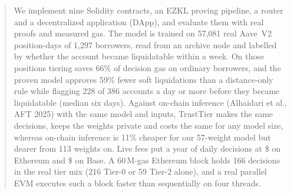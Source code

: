\documentclass[sigconf,nonacm]{acmart}
\begin{document}
\begin{abstract}
We implement nine Solidity contracts, an EZKL proving pipeline, a router and a decentralized application (DApp), and evaluate them with real proofs and measured gas. The model is trained on 57,081 real Aave~V2 position-days of 1,297 borrowers, read from an archive node and labelled by whether the account became liquidatable within a week. On those positions tiering saves 66\% of decision gas on ordinary borrowers, and the proven model approves 59\% fewer soft liquidations than a distance-only rule while flagging 228 of 386 accounts a day or more before they became liquidatable (median six days). Against on-chain inference (Alhaidari et al., AFT 2025) with the same model and inputs, TrustTier makes the same decisions, keeps the weights private and costs the same for any model size, whereas on-chain inference is 11\% cheaper for our 57-weight model but dearer from 113 weights on. Live fees put a year of daily decisions at \$\leTtLone{} on Ethereum and \$\leTtBaseYr{} on Base. A 60\,M-gas Ethereum block holds 166 decisions in the real tier mix (216 Tier-0 or 59 Tier-2 alone), and a real parallel EVM executes such a block \pevmHeadline{} faster than sequentially on four threads.
\end{abstract}

\end{document}
